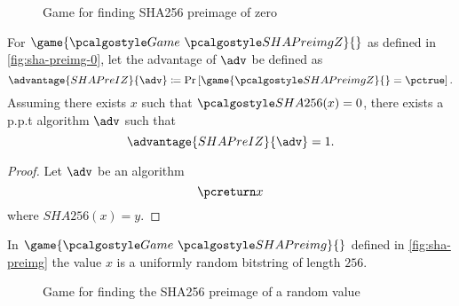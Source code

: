 
\begin{figure}[tbhp]
  \begin{center}
    \begin{tcolorbox}[width=5cm]
      \begin{pchstack}[center]
      \end{pchstack}
    \end{tcolorbox}
  \end{center}
  \caption{Game for finding SHA256 preimage of zero \label{fig:sha-preimg-0}}
\end{figure}

\begin{proposition}
 For $\game{\Game~\algo{SHAPreimgZ}}{}$ as defined in \autoref{fig:sha-preimg-0}, let the advantage of $\adv$ be defined as
 \[
  \advantage{SHAPreIZ}{\adv} \defeq \pr{\game{\algo{SHAPreimgZ}}{} = \pctrue}.
 \]
 Assuming there exists $x$ such that $\algo{SHA256}(x) = 0$, there exists a p.p.t algorithm $\adv$ such that
  \[
  \advantage{SHAPreIZ}{\adv} = 1.
  \]
\end{proposition}

\begin{proof}
  Let $\adv$ be an algorithm
  \[
   \pcreturn x
  \]
  where $SHA256(x) = y$.
\end{proof}

In $\game{\Game~\algo{SHAPreimg}}{}$ defined in \autoref{fig:sha-preimg} the value $x$ is a uniformly random bitstring of length $256$.

\begin{figure}[tbhp]
  \begin{center}
    \begin{tcolorbox}[width=5cm]
      \begin{pchstack}[center]
      \end{pchstack}
    \end{tcolorbox}
  \end{center}
  \caption{Game for finding the SHA256 preimage of a random value \label{fig:sha-preimg}}
\end{figure}

